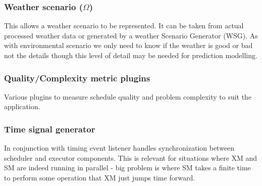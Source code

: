 \subsubsection{Weather scenario ($\Omega$)}
This allows a weather scenario to be represented. It can be taken from actual processed weather data or generated by a weather Scenario Generator (WSG). As with environmental scenario we only need to know if the weather is good or bad not the details though this level of detail may be needed for prediction modelling.

\subsubsection{Quality/Complexity metric plugins}
Various plugins to measure schedule quality and problem complexity to suit the application.

\subsubsection{Time signal generator}
In conjunction with timing event listener handles synchronization between scheduler and executor components. This is relevant for situations where XM and SM are indeed running in parallel - big problem is where SM takes a finite time to perform some operation that XM just jumps time forward.
